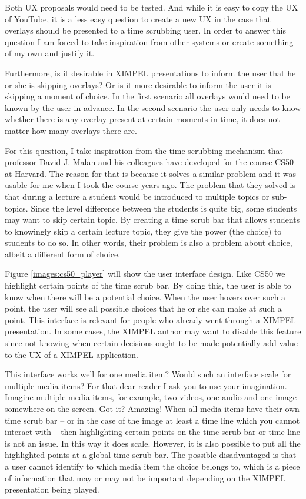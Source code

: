 Both UX proposals would need to be tested. And while it is easy to copy the UX of YouTube, it is a less easy question to create a new UX in the case that overlays should be presented to a time scrubbing user. In order to answer this question I am forced to take inspiration from other systems or create something of my own and justify it.

Furthermore, is it desirable in XIMPEL presentations to inform the user that he or she is skipping overlays? Or is it more desirable to inform the user it is skipping a moment of choice. In the first scenario all overlays would need to be known by the user in advance. In the second scenario the user only needs to know whether there is any overlay present at certain moments in time, it does not matter how many overlays there are.

For this question, I take inspiration from the time scrubbing mechanism that professor David J. Malan and his colleagues have developed for the course CS50 at Harvard. The reason for that is because it solves a similar problem and it was usable for me when I took the course years ago. The problem that they solved is that during a lecture a student would be introduced to multiple topics or sub-topics. Since the level difference between the students is quite big, some students may want to skip certain topic. By creating a time scrub bar that allows students to knowingly skip a certain lecture topic, they give the power (the choice) to students to do so. In other words, their problem is also a problem about choice, albeit a different form of choice. 


Figure \ref{images:cs50_player} will show the user interface design. Like CS50 we highlight certain points of the time scrub bar. By doing this, the user is able to know when there will be a potential choice. When the user hovers over such a point, the user will see all possible choices that he or she can make at such a point. This interface is relevant for people who already went through a XIMPEL presentation. In some cases, the XIMPEL author may want to disable this feature since not knowing when certain decisions ought to be made potentially add value to the UX of a XIMPEL application.

This interface works well for one media item? Would such an interface scale for multiple media items? For that dear reader I ask you to use your imagination. Imagine multiple media items, for example, two videos, one audio and one image somewhere on the screen. Got it? Amazing! When all media items have their own time scrub bar -- or in the case of the image at least a time line which you cannot interact with -- then highlighting certain points on the time scrub bar or time line is not an issue. In this way it does scale. However, it is also possible to put all the highlighted points at a global time scrub bar. The possible disadvantaged is that a user cannot identify to which media item the choice belongs to, which is a piece of information that may or may not be important depending on the XIMPEL presentation being played.

